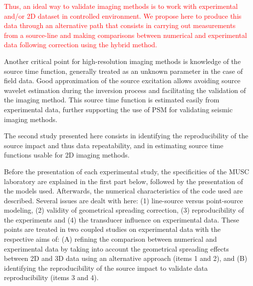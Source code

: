 \documentclass[extra,mreferee]{gji}
\begin{document}
\textcolor{red}{Thus, an ideal way to validate imaging methods is to work with experimental and/or 2D dataset in controlled environment. We propose here to produce this data through an alternative path that consists in carrying out measurements from a source-line and making comparisons between numerical and experimental data following correction using the hybrid method.}

Another critical point for high-resolution imaging methods is knowledge of the source time function, generally treated as an unknown parameter in the case of field data. Good approximation of the source excitation allows avoiding source wavelet estimation during the inversion process and facilitating the validation of the imaging method. This source time function is estimated easily from experimental data, further supporting the use of PSM for validating seismic imaging methods.

The second study presented here consists in identifying the reproducibility of the source impact and thus data repeatability, and in estimating source time functions usable for 2D imaging methods.


Before the presentation of each experimental study, the specificities of the MUSC laboratory are explained in the first part below, followed by the presentation of the models used. Afterwards, the numerical characteristics of the code used are described. Several issues are dealt with here: (1) line-source versus point-source modeling, (2) validity of geometrical spreading correction, (3) reproducibility of the experiments and (4) the transducer influence on experimental data. These points are treated in two coupled studies on experimental data with the respective aims of: (A) refining the comparison between numerical and experimental data by taking into account the geometrical spreading effects between 2D and 3D data using an alternative approach (items 1 and 2), and (B) identifying the reproducibility of the source impact to validate data reproducibility (items 3 and 4).
\end{document}
